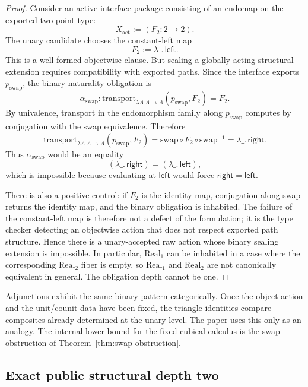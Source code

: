 \documentclass{lmcs}
\begin{document}
\begin{proof}
Consider an active-interface package consisting of an endomap on the exported two-point
type:
\[
  X_{\mathrm{act}} := (F_2 : 2\to 2).
\]
The unary candidate chooses the constant-left map
\[
  F_2 := \lambda\_.\,\mathsf{left}.
\]
This is a well-formed objectwise clause.  But sealing a globally acting structural extension
requires compatibility with exported paths.  Since the interface exports
\(p_{\mathrm{swap}}\), the binary naturality obligation is
\[
  \alpha_{\mathrm{swap}}:
  \mathrm{transport}_{\lambda A. A\to A}(p_{\mathrm{swap}},F_2)=F_2.
\]
By univalence, transport in the endomorphism family along \(p_{\mathrm{swap}}\) computes by
conjugation with the swap equivalence.  Therefore
\[
  \mathrm{transport}_{\lambda A. A\to A}(p_{\mathrm{swap}},F_2)
  =
  \mathrm{swap}\circ F_2\circ \mathrm{swap}^{-1}
  =
  \lambda\_.\,\mathsf{right}.
\]
Thus \(\alpha_{\mathrm{swap}}\) would be an equality
\[
  (\lambda\_.\,\mathsf{right})=(\lambda\_.\,\mathsf{left}),
\]
which is impossible because evaluating at \(\mathsf{left}\) would force
\(\mathsf{right}=\mathsf{left}\).

There is also a positive control: if \(F_2\) is the identity map, conjugation along swap
returns the identity map, and the binary obligation is inhabited.  The failure of the
constant-left map is therefore not a defect of the formulation; it is the type checker
detecting an objectwise action that does not respect exported path structure.  Hence
there is a unary-accepted raw action whose binary sealing extension is impossible.  In
particular, \(\mathrm{Real}_1\) can be inhabited in a case where the corresponding
\(\mathrm{Real}_2\) fiber is empty, so \(\mathrm{Real}_1\) and \(\mathrm{Real}_2\) are not
canonically equivalent in general.  The obligation depth cannot be one.
\end{proof}

\begin{rem}
Adjunctions exhibit the same binary pattern categorically.  Once the object action and the
unit/counit data have been fixed, the triangle identities compare composites already
determined at the unary level.  The paper uses this only as an analogy.  The internal lower
bound for the fixed cubical calculus is the swap obstruction of
Theorem~\ref{thm:swap-obstruction}.
\end{rem}

\subsection{Exact public structural depth two}
\label{subsec:exact-depth-two-conclusion}
\end{document}
